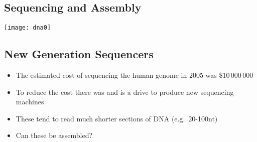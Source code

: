
\begin{slide}
\section[-1]{Sequencing and Assembly}
\pause
\pb

\begin{center}
  \texttt{[image: dna0]}
\end{center}


\end{slide}




\begin{slide}
\section{New Generation Sequencers}

\begin{PauseHighLight}
  \begin{itemize}
  \item The estimated cost of sequencing the human genome in 2005
    was \$$10\,000\,000$\pause
  \item To reduce the cost there was and is a drive to produce new sequencing
    machines\pause
  \item These tend to read much shorter sections of DNA (e.g.\
    20-100nt)\pause
  \item Can these be assembled?\pause
  \end{itemize}
\end{PauseHighLight}

\end{slide}


